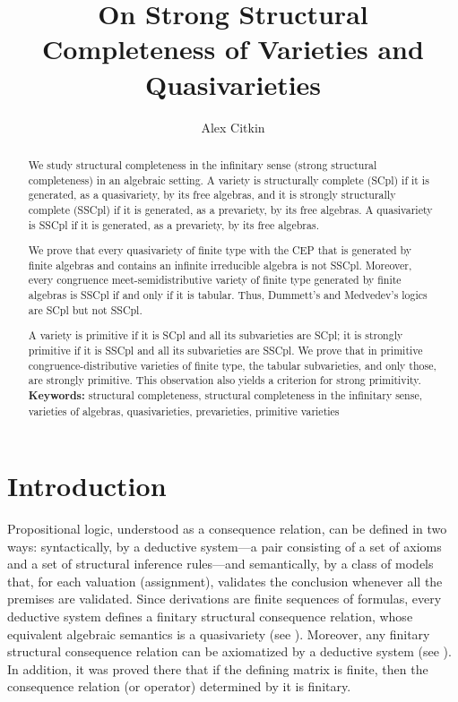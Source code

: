\documentclass[submission,copyright,creativecommons]{eptcs}
\title{On Strong Structural Completeness of Varieties and Quasivarieties}
\author{Alex Citkin
\institute{Metropolitan Telecommunications\\ New York, USA}
\email{acitkin@gmail.com}
}
\theoremstyle{definition}
\begin{document}
\maketitle


\begin{abstract}
We study structural completeness in the infinitary sense (strong structural completeness) in an algebraic setting. A variety is structurally complete (SCpl) if it is generated, as a quasivariety, by its free algebras, and it is strongly structurally complete (SSCpl) if it is generated, as a prevariety, by its free algebras. A quasivariety is SSCpl if it is generated, as a prevariety, by its free algebras.

We prove that every quasivariety of finite type with the CEP that is generated by finite algebras and contains an infinite irreducible algebra is not SSCpl. Moreover, every congruence meet-semidistributive variety of finite type generated by finite algebras is SSCpl if and only if it is tabular. Thus, Dummett’s and Medvedev’s logics are SCpl but not SSCpl.

A variety is primitive if it is SCpl and all its subvarieties are SCpl; it is strongly primitive if it is SSCpl and all its subvarieties are SSCpl. We prove that in primitive congruence-distributive varieties of finite type, the tabular subvarieties, and only those, are strongly primitive. This observation also yields a criterion for strong primitivity.
\\

\noindent\textbf{Keywords:}
structural completeness,
structural completeness in the infinitary sense,
varieties of algebras,
quasivarieties,
prevarieties,
primitive varieties

\end{abstract}

\section{Introduction}
 
Propositional logic, understood as a consequence relation, can be defined in two ways: syntactically, by a deductive system—a pair consisting of a set of axioms and a set of structural inference rules—and semantically, by a class of models that, for each valuation (assignment), validates the conclusion whenever all the premises are validated. Since derivations are finite sequences of formulas, every deductive system defines a finitary structural consequence relation, whose equivalent algebraic semantics is a quasivariety (see \cite{BlokPigozziAlgebraizable1989}). Moreover, any finitary structural consequence relation can be axiomatized by a deductive system (see \cite{LosSuszkoRemarks1958}). In addition, it was proved there that if the defining matrix is finite, then the consequence relation (or operator) determined by it is finitary.
\end{document}
